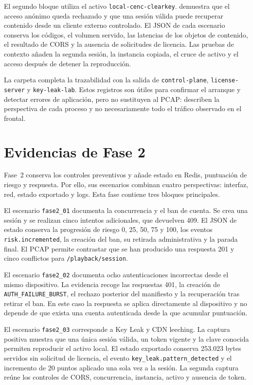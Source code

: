 El segundo bloque utiliza el activo \texttt{local-cenc-clearkey}.  demuestra que el acceso anónimo queda rechazado y que una sesión válida puede recuperar contenido desde un cliente externo controlado. El JSON de cada escenario conserva los códigos, el volumen servido, las latencias de los objetos de contenido, el resultado de CORS y la ausencia de solicitudes de licencia. Las pruebas de contexto añaden la segunda sesión, la instancia copiada, el cruce de activo y el acceso después de detener la reproducción.

La carpeta  completa la trazabilidad con la salida de \texttt{control-plane}, \texttt{license-server} y \texttt{key-leak-lab}. Estos registros son útiles para confirmar el arranque y detectar errores de aplicación, pero no sustituyen al PCAP: describen la perspectiva de cada proceso y no necesariamente todo el tráfico observado en el frontal.

\section{Evidencias de Fase 2}

Fase~2 conserva los controles preventivos y añade estado en Redis, puntuación de riesgo y respuesta. Por ello, sus escenarios combinan cuatro perspectivas: interfaz, red, estado exportado y logs. Esta fase contiene tres bloques principales.

El escenario \texttt{fase2\_01} documenta la concurrencia y el ban de cuenta. Se crea una sesión y se realizan cinco intentos adicionales, que devuelven 409. El JSON de estado conserva la progresión de riesgo 0, 25, 50, 75 y 100, los eventos \texttt{risk.incremented}, la creación del ban, su retirada administrativa y la parada final. El PCAP permite contrastar que se han producido una respuesta 201 y cinco conflictos para \texttt{/playback/session}.

El escenario \texttt{fase2\_02} documenta ocho autenticaciones incorrectas desde el mismo dispositivo. La evidencia recoge las respuestas 401, la creación de \texttt{AUTH\_FAILURE\_BURST}, el rechazo posterior del manifiesto y la recuperación tras retirar el ban. En este caso la respuesta se aplica directamente al dispositivo y no depende de que exista una cuenta autenticada desde la que acumular puntuación.

El escenario \texttt{fase2\_03} corresponde a Key Leak y CDN leeching. La captura positiva muestra que una única sesión válida, un token vigente y la clave conocida permiten reproducir el activo local. El estado exportado conserva 253.023 bytes servidos sin solicitud de licencia, el evento \texttt{key\_leak.pattern\_detected} y el incremento de 20 puntos aplicado una sola vez a la sesión. La segunda captura reúne los controles de CORS, concurrencia, instancia, activo y ausencia de token.

